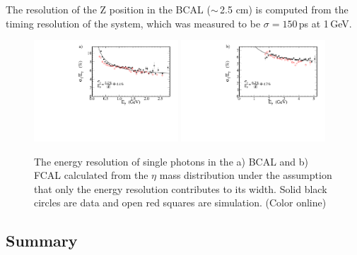 The resolution of the Z position in the BCAL ($\sim$\,2.5 cm) is computed from the timing resolution of the system, which was measured to be $\sigma=150$\,ps at 1\,GeV.


\begin{figure}[tbh]\centering
\includegraphics[width=0.48\textwidth]{figures/fit_BCAL_energy_resolution_sigma.pdf} \includegraphics[width=0.48\textwidth]{figures/fit_FCAL_energy_resolution_sigma.pdf}
\caption{\label{fig:bcal:eta_resolution} 
The energy resolution of single photons in the a) BCAL and b) FCAL calculated from the $\eta$ mass distribution under the assumption that only the energy resolution contributes to its width.  Solid black circles are data and open red squares are simulation.
(Color online)
 }
\end{figure}    






\subsection{Summary \label{sec:calsummary}}